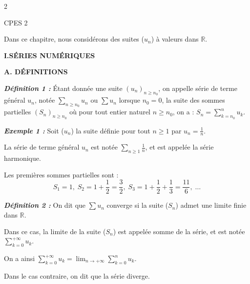 \documentclass[10pt,a4paper]{article}
\begin{document}
\begin{multicols}{2}

\begin{flushright}
\footnotesize CPES 2
\end{flushright}

\vspace{-0.2cm}
\begin{center}
\end{center}
\vspace{0.1cm}

Dans ce chapitre, nous considérons des suites ($u_n$) à valeurs dans $\mathbb{R}$.

\vspace{0.2cm}
\textbf{\textcolor{mainbrown}{I.\quad SÉRIES NUMÉRIQUES}}

\vspace{0.1cm}
\textbf{\textcolor{maingreen}{A. DÉFINITIONS}}

\textbf{\textit{Définition 1 :}} Étant donnée une suite $(u_n)_{n \ge n_0}$, on appelle série de terme général $u_n$, notée $\sum_{n \ge n_0} u_n$ ou $\sum u_n$ lorsque $n_0 = 0$, la suite des sommes partielles $(S_n)_{n \ge n_0}$ où pour tout entier naturel $n \ge n_0$, on a : $S_n = \sum_{k=n_0}^n u_k$.

\textbf{\textit{Exemple 1 :}} Soit ($u_n$) la suite définie pour tout $n \ge 1$ par $u_n = \frac{1}{n}$.

La série de terme général $u_n$ est notée $\sum_{n \ge 1} \frac{1}{n}$, et est appelée la série harmonique.

Les premières sommes partielles sont :
\begin{equation*}
S_1 = 1,\; S_2 = 1 + \frac{1}{2} = \frac{3}{2},\; S_3 = 1 + \frac{1}{2} + \frac{1}{3} = \frac{11}{6},\; \dots
\end{equation*}

\textbf{\textit{Définition 2 :}} On dit que $\sum u_n$ converge si la suite ($S_n$) admet une limite finie dans $\mathbb{R}$.

Dans ce cas, la limite de la suite ($S_n$) est appelée somme de la série, et est notée $\sum_{k=0}^{+\infty} u_k$.

On a ainsi $\sum_{k=0}^{+\infty} u_k = \lim_{n \to +\infty} \sum_{k=0}^n u_k$.

Dans le cas contraire, on dit que la série diverge.


\end{multicols}
\end{document}
